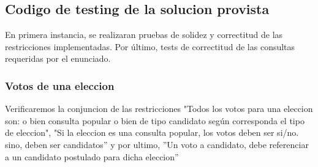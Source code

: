 \subsection{Codigo de testing de la solucion provista}

En primera instancia, se realizaran pruebas de solidez y correctitud de las restricciones implementadas. Por último, tests de correctitud de las consultas requeridas por el enunciado.

\subsubsection{Votos de una eleccion}

Verificaremos la conjuncion de las restricciones "Todos los votos para una eleccion son: o bien consulta popular o bien de tipo candidato según corresponda el tipo de eleccion",  "Si la eleccion es una consulta popular, los votos deben ser si/no. sino, deben ser candidatos'' y por ultimo, ''Un voto a candidato, debe referenciar a un candidato postulado para dicha eleccion''

